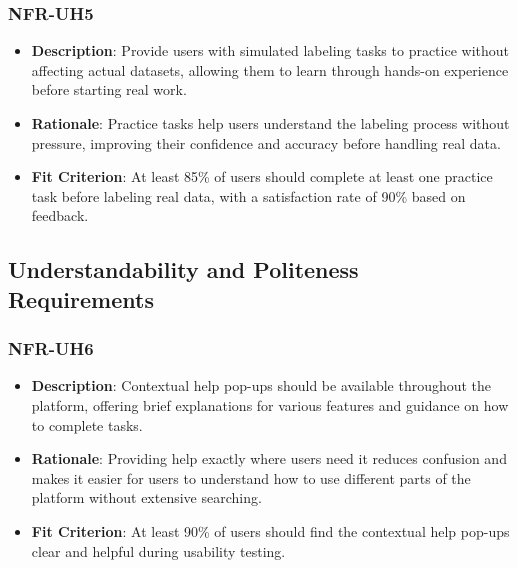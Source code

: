\documentclass[12pt]{article}
\begin{document}
        \subsubsection*{NFR-UH5} 
        \begin{itemize} 
            \item \textbf{Description}: Provide users with simulated labeling tasks to practice without affecting actual datasets, allowing them to learn through hands-on experience before starting real work.  
            \item \textbf{Rationale}: Practice tasks help users understand the labeling process without pressure, improving their confidence and accuracy before handling real data.  
            \item \textbf{Fit Criterion}: At least 85\% of users should complete at least one practice task before labeling real data, with a satisfaction rate of 90\% based on feedback.
        \end{itemize}


\subsection{Understandability and Politeness Requirements}


\subsubsection*{NFR-UH6} 
        \begin{itemize} 
            \item \textbf{Description}: Contextual help pop-ups should be available throughout the platform, offering brief explanations for various features and guidance on how to complete tasks.  
            \item \textbf{Rationale}: Providing help exactly where users need it reduces confusion and makes it easier for users to understand how to use different parts of the platform without extensive searching.  
            \item \textbf{Fit Criterion}: At least 90\% of users should find the contextual help pop-ups clear and helpful during usability testing.
        \end{itemize}
\end{document}
